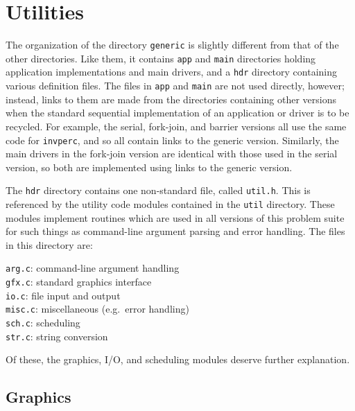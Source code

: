 \section{Utilities\label{s:util}}

The organization of the directory {\tt{generic}} is slightly different from
that of the other directories.
Like them,
it contains {\tt{app}} and {\tt{main}} directories
holding application implementations and main drivers,
and a {\tt{hdr}} directory containing various definition files.
The files in {\tt{app}} and {\tt{main}} are not used directly, however;
instead,
links to them are made from the directories containing other versions
when the standard sequential implementation of an application or driver
is to be recycled.
For example,
the serial, fork-join, and barrier versions all use
the same code for {\tt{invperc}},
and so all contain links to the generic version.
Similarly,
the main drivers in the fork-join version are identical with those used
in the serial version,
so both are implemented using links to the generic version.

The {\tt{hdr}} directory contains one non-standard file,
called {\tt{util.h}}.
This is referenced by the utility code modules
contained in the {\tt{util}} directory.
These modules implement routines which are used
in all versions of this problem suite
for such things as
command-line argument parsing and error handling.
The files in this directory are:
\begin{small}\begin{tabbing}
{\tt{arg.c}}: command-line argument handling\\
{\tt{gfx.c}}: standard graphics interface\\
{\tt{io.c}}: file input and output\\
{\tt{misc.c}}: miscellaneous (e.g.\ error handling)\\
{\tt{sch.c}}: scheduling\\
{\tt{str.c}}: string conversion
\end{tabbing}\end{small}
Of these,
the graphics, I/O, and scheduling modules deserve further explanation.

\subsection{Graphics\label{s:util-gfx}}

